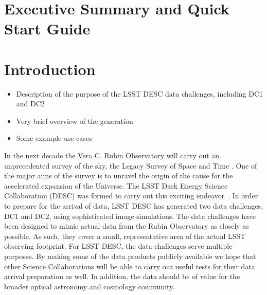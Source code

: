 \documentclass[11pt]{report}
\begin{document}
\setlength\parindent{0em}
\setlength{\parskip}{0.5em}



\renewcommand{\thepage}{\arabic{page}}
\setcounter{page}{1}

\renewcommand\thefigure{\arabic{figure}}
\setcounter{figure}{0}


\section*{Executive Summary and Quick Start Guide}




\section{Introduction}


\begin{itemize}
\item Description of the purpose of the LSST DESC data challenges, including DC1 and DC2
\item Very brief overview of the generation
\item Some example use cases
\end{itemize}

In the next decade the Vera C. Rubin Observatory will carry out an unprecedented survey of the sky, the Legacy Survey of Space and Time \citep{2009arXiv0912.0201L}. One of the major aims of the survey is to unravel the origin of the cause for the accelerated expansion of the Universe. The LSST Dark Energy Science Collaboration (DESC) was formed to carry out this exciting endeavor~\citep{Abate:2012za}. In order to prepare for the arrival of data, LSST DESC has generated two data challenges, DC1 and DC2, using sophisticated image simulations. The data challenges have been designed to mimic actual data from the Rubin Observatory as closely as possible. As such, they cover a small, representative area of the actual LSST observing footprint. For LSST DESC, the data challenges serve multiple purposes.  By making some of the data products publicly available we hope that other Science Collaborations will be able to carry out useful tests for their data arrival preparation as well. In addition, the data should be of value for the broader optical astronomy and cosmology community.
\end{document}
